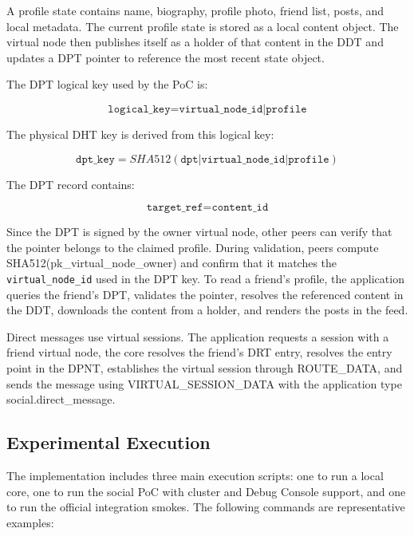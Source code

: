 \documentclass[12pt]{article}
\newcommand{\codebreak}[1]{{\footnotesize\ttfamily #1}}
\begin{document}
A profile state contains name, biography, profile photo, friend list, posts, and local metadata. The current profile state is stored as a local content object. The virtual node then publishes itself as a holder of that content in the DDT and updates a DPT pointer to reference the most recent state object.

The DPT logical key used by the PoC is:

\begin{equation}
    \texttt{logical\_key} = \texttt{virtual\_node\_id|profile}
\end{equation}

The physical DHT key is derived from this logical key:

\begin{equation}
    \texttt{dpt\_key} = SHA512(\texttt{dpt|virtual\_node\_id|profile})
\end{equation}

The DPT record contains:

\begin{equation}
    \texttt{target\_ref} = \texttt{content\_id}
\end{equation}

Since the DPT is signed by the owner virtual node, other peers can verify that the pointer belongs to the claimed profile. During validation, peers compute \codebreak{SHA\allowbreak{}512(pk\_\allowbreak{}virtual\_\allowbreak{}node\_\allowbreak{}owner)} and confirm that it matches the \texttt{virtual\_node\_id} used in the DPT key. To read a friend's profile, the application queries the friend's DPT, validates the pointer, resolves the referenced content in the DDT, downloads the content from a holder, and renders the posts in the feed.

Direct messages use virtual sessions. The application requests a session with a friend virtual node, the core resolves the friend's DRT entry, resolves the entry point in the DPNT, establishes the virtual session through \codebreak{ROUTE\_\allowbreak{}DATA}, and sends the message using \codebreak{VIRTUAL\_\allowbreak{}SESSION\_\allowbreak{}DATA} with the application type \codebreak{social.direct\_\allowbreak{}message}.

\subsection{Experimental Execution}
\label{sec:experimental-execution}

The implementation includes three main execution scripts: one to run a local core, one to run the social PoC with cluster and Debug Console support, and one to run the official integration smokes. The following commands are representative examples:
\end{document}
